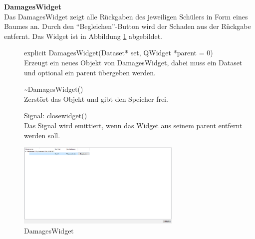 \textbf{DamagesWidget}\\
Das DamagesWidget zeigt alle Rückgaben des jeweiligen Schülers in Form eines Baumes an. Durch den "`Begleichen"'-Button wird der Schaden aus der Rückgabe entfernt. Das Widget ist in Abbildung \ref{fig:DamagesWidget} abgebildet.
\begin{description}
	\item[ ] explicit DamagesWidget(Dataset* set, QWidget *parent = 0)\\
	Erzeugt ein neues Objekt von DamagesWidget, dabei muss ein Dataset und optional ein parent übergeben werden.
  \item[ ] \~{}DamagesWidget()\\
	Zerstört das Objekt und gibt den Speicher frei.
	\item[ ] Signal: closewidget()\\
	Das Signal wird emittiert, wenn das Widget aus seinem parent entfernt werden soll.
\end{description}
\begin{figure}[htb]
	\centering
		\includegraphics[width=0.70\textwidth]{figures/DamagesWidget.PNG}
	\caption{DamagesWidget}
	\label{fig:DamagesWidget}
\end{figure}

